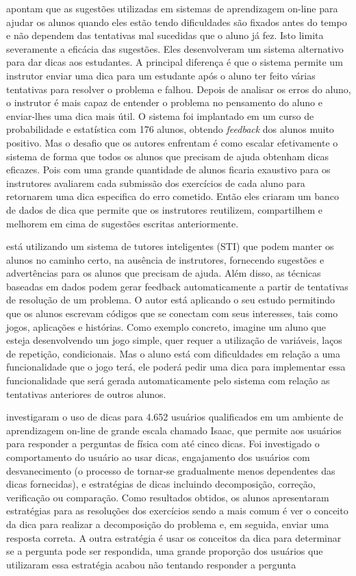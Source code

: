  apontam que as sugestões utilizadas em sistemas de aprendizagem on-line para ajudar os alunos quando eles estão tendo dificuldades são fixados antes do tempo e não dependem das tentativas mal sucedidas que o aluno já fez. Isto limita severamente a eficácia das sugestões. Eles desenvolveram um sistema alternativo para dar dicas aos estudantes. A principal diferença é que o sistema permite um instrutor enviar uma dica para um estudante após o aluno ter feito várias tentativas para resolver o problema e falhou. Depois de analisar os erros do aluno, o instrutor é mais capaz de entender o problema no pensamento do aluno e enviar-lhes uma dica mais útil. O sistema foi implantado em um curso de probabilidade e estatística com 176 alunos, obtendo \textit{feedback} dos alunos muito positivo. Mas o desafio que os autores enfrentam é como escalar efetivamente o sistema de forma que todos os alunos que precisam de ajuda obtenham dicas eficazes. Pois com uma grande quantidade de alunos ficaria exaustivo para os instrutores avaliarem cada submissão dos exercícios de cada aluno para retornarem uma dica especifica do erro cometido. Então eles criaram um banco de dados de dica que permite que os instrutores reutilizem, compartilhem e melhorem em cima de sugestões escritas anteriormente.

 está utilizando um sistema de tutores inteligentes (STI) que podem manter os alunos no caminho certo, na ausência de instrutores, fornecendo sugestões e advertências para os alunos que precisam de ajuda. Além disso, as técnicas baseadas em dados podem gerar feedback automaticamente a partir de tentativas de resolução de um problema. O autor está aplicando o seu estudo permitindo que os alunos escrevam códigos que se conectam com seus interesses, tais como jogos, aplicações e histórias. Como exemplo concreto, imagine um aluno que esteja desenvolvendo um jogo simple, quer requer a utilização de variáveis, laços de repetição, condicionais. Mas o aluno está com dificuldades em relação a uma funcionalidade que o jogo terá, ele poderá pedir uma dica para implementar essa funcionalidade que será gerada automaticamente pelo sistema com relação as tentativas anteriores de outros alunos.

 investigaram  o uso de dicas para 4.652 usuários qualificados em um ambiente de aprendizagem on-line de grande escala chamado Isaac, que permite aos usuários para responder a perguntas de física com até cinco dicas. Foi investigado o comportamento do usuário ao usar dicas, engajamento dos usuários com desvanecimento (o processo de tornar-se gradualmente menos dependentes das dicas fornecidas), e estratégias de dicas incluindo decomposição, correção, verificação ou comparação. Como resultados obtidos, os alunos apresentaram estratégias para as resoluções dos exercícios sendo a mais comum é ver o conceito da dica para realizar a decomposição do problema e, em seguida, enviar uma resposta correta. A outra estratégia é usar os conceitos da dica para determinar se a pergunta pode ser respondida, uma grande proporção dos usuários que utilizaram essa estratégia acabou não tentando responder a pergunta


